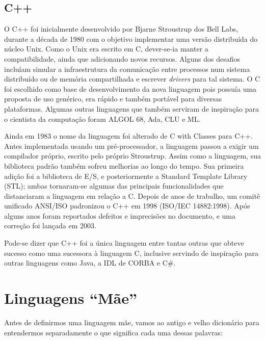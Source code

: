 \documentclass[
    12pt,               %
    openany,            %
    twoside,            %
    a4paper,            %
    brazil              %
    ]{abntex2}
\begin{document}
\clearpage
\section{C++}

O C++ foi inicialmente desenvolvido por Bjarne Stroustrup dos Bell Labs,
durante a década de 1980 com o objetivo implementar uma versão distribuída do
núcleo Unix. Como o Unix era escrito em C, dever-se-ia manter a
compatibilidade, ainda que adicionando novos recursos. Alguns dos desafios
incluíam simular a infraestrutura da comunicação entre processos num sistema
distribuído ou de memória compartilhada e escrever \textit{drivers} para tal
sistema. O C foi escolhido como base de desenvolvimento da nova linguagem pois
possuía uma proposta de uso genérico, era rápido e também portável para
diversas plataformas. Algumas outras linguagens que também serviram de
inspiração para o cientista da computação foram ALGOL 68, Ada, CLU e ML.

Ainda em 1983 o nome da linguagem foi alterado de C with Classes para C++.
Antes implementada usando um pré-processador, a linguagem passou a exigir um
compilador próprio, escrito pelo próprio Stroustrup. Assim como a linguagem,
sua biblioteca padrão também sofreu melhorias ao longo do tempo. Sua primeira
adição foi a biblioteca de E/S, e posteriormente a Standard Template Library
(STL); ambas tornaram-se algumas das principais funcionalidades que
distanciaram a linguagem em relação a C.  Depois de anos de trabalho, um comitê
unificado ANSI/ISO padronizou o C++ em 1998 (ISO/IEC 14882:1998). Após alguns
anos foram reportados defeitos e imprecisões no documento, e uma correção foi
lançada em 2003.

Pode-se dizer que C++ foi a única linguagem entre tantas outras que obteve
sucesso como uma sucessora à linguagem C, inclusive servindo de inspiração para
outras linguagens como Java, a IDL de CORBA e C\#.

\chapter{Linguagens “Mãe”}

Antes de definirmos uma linguagem mãe, vamos ao antigo e velho dicionário para
entendermos separadamente o que significa cada uma dessas palavras: 
\end{document}
